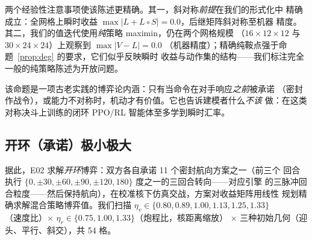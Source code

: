 \documentclass[12pt,a4paper]{ctexart}
\newcommand{\etav}{\eta_v}
\newcommand{\etar}{\eta_r}
\begin{document}
两个经验性注意事项使该陈述更精确。其一，斜对称\emph{前提}在我们的形式化中
精确成立：全网格上瞬时收益 $\max|L+L\circ S|=0.0$，后继矩阵斜对称至机器
精度。其二，我们的值迭代使用\emph{纯}策略 maximin，仍在两个网格规模
（$16\times12\times12$ 与 $30\times24\times24$）上观察到 $\max|V-L|=0.0$
（机器精度）；精确纯鞍点强于命题~\ref{prop:deg} 的要求，它们似乎反映瞬时
收益与动作集的结构——我们标注完全一般的纯策略陈述为开放问题。

该命题是一项古老实践的博弈论内涵：只有当命令在对手响应\emph{之前}被承诺
（密封作战令），或能力不对称时，机动才有价值。它也告诉建模者什么\emph{不该}
做：在这类对称决斗上训练的闭环 PPO/RL 智能体至多学到瞬时汇率。

\subsection{开环（承诺）极小极大}
据此，E02 求解\emph{开环}博弈：双方各自承诺 11 个密封航向方案之一（前三个
回合执行 $\{0,\pm30,\pm60,\pm90,\pm120,180\}$ 度之一的三回合转向——对应引擎
的三脉冲回合粒度——然后保持航向），在校准核下仿真交战，方案对收益矩阵用线性
规划精确求解混合策略博弈值。我们扫描 $\etav\in\{0.80,0.89,1.00,1.13,1.25,
1.33\}$（速度比）$\times$ $\etar\in\{0.75,1.00,1.33\}$（炮程比，核距离缩放）
$\times$ 三种初始几何（迎头、平行、斜交），共 54 格。
\end{document}
